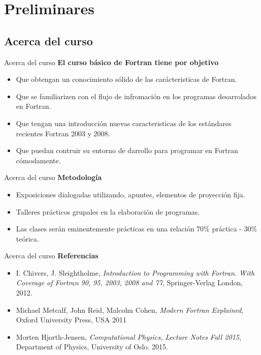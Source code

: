 \section{Preliminares}



\subsection{Acerca del curso}
\begin{frame}[fragile]{Acerca del curso}
  \textbf{El curso básico de Fortran tiene por objetivo}
  \begin{itemize}[<+(1)->]
    \item Que obtengan un conocimiento sólido de las carácteristicas de Fortran.
    \item Que se familiarizen con el flujo de infromación en los programas desarrolados en Fortran.
    \item Que tengan una introducción nuevas caracteristicas de los estándares recientes Fortran 2003 y 2008.
    \item Que puedan contruir su entorno de darrollo para programar en Fortran cómodamente.
  \end{itemize}
\end{frame}


\begin{frame}[fragile]{Acerca del curso}
  \textbf{Metodología}
  \begin{itemize}[<+(1)->]
    \item Exposiciones dialogadas utilizando, apuntes, elementos de proyección fija.
    \item Talleres prácticos grupales en la elaboración de programas.
    \item Las clases serán eminentemente prácticas en una relación 70\% práctica - 30\% teórica.
  \end{itemize}
\end{frame}

\begin{frame}[fragile]{Acerca del curso}
  \textbf{Referencias}
  \begin{itemize}[<+(1)->]
    \item I. Chivers, J. Sleightholme, \textit{Introduction to Programming with Fortran. With Coverage of Fortran 90, 95, 2003, 2008 and 77}, Springer-Verlag London, 2012.
    \item Michael Metcalf, John Reid, Malcolm Cohen, \textit{Modern Fortran Explained}, Oxford University Press, USA 2011
    \item Morten Hjorth-Jensen, \textit{Computational Physics, Lecture Notes Fall 2015}, Department of Physics, University of Oslo. 2015.
  \end{itemize}
\end{frame}

